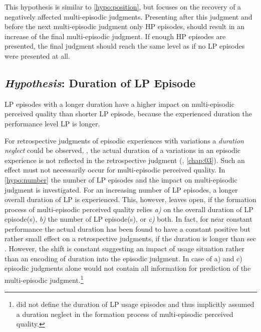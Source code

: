 This hypothesis is similar to \autoref{hypo:position}, but focuses on the recovery of a negatively affected multi-episodic judgments.
Presenting after this judgment and before the next multi-episodic judgment only \ac{HP} episodes, should result in an increase of the final multi-episodic judgment.
If enough \ac{HP} episodes are presented, the final judgment should reach the same level as if no \ac{LP} episodes were presented at all.

\subsection{\emph{Hypothesis}: Duration of \acs{LP} Episode}
\begin{hypothesis}\label{hypo:duration}
\ac{LP} episodes with a longer duration have a higher impact on multi-episodic perceived quality than shorter \ac{LP} episode, because the experienced duration the performance level \ac{LP} is longer.
\end{hypothesis}

For retrospective judgments of episodic experiences with variations a \emph{duration neglect} could be observed, \ie, the actual duration of a variations in an episodic experience is not reflected in the retrospective judgment (\cf, \autoref{chap:03}).
Such an effect must not necessarily occur for multi-episodic perceived quality.
In \autoref{hypo:number} the number of \ac{LP} episodes and the impact on multi-episodic judgment is investigated.
For an increasing number of \ac{LP} episodes, a longer overall duration of \ac{LP} is experienced.
This, however, leaves open, if the formation process of multi-episodic perceived quality relies \emph{a)} on the overall duration of \ac{LP} episode(s), \emph{b)} the number of \ac{LP} episode(s), or \emph{c)} both.
In fact, for near constant performance the actual duration has been found to have a constant positive but rather small effect on a retrospective judgments, if the duration is longer than \unit[30]{sec} \citep[\cf,][]{frohlich_qoe_2012}.
However, the shift is constant suggesting an impact of usage situation rather than an encoding of duration into the episodic judgment.
In case of a) and c) episodic judgments alone would not contain all information for prediction of the multi-episodic judgment.\footnote{\citet[p. 2]{moller_single-call_2011} did not define the duration of \ac{LP} usage episodes and thus implicitly assumed a duration neglect in the formation process of multi-episodic perceived quality.}

